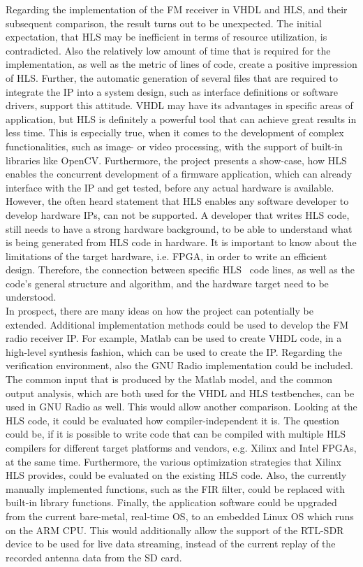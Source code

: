 Regarding the implementation of the FM receiver in VHDL and HLS, and their subsequent comparison, the result turns out to be unexpected.
The initial expectation, that HLS may be inefficient in terms of resource utilization, is contradicted.
Also the relatively low amount of time that is required for the implementation, as well as the metric of lines of code, create a positive impression of HLS.
Further, the automatic generation of several files that are required to integrate the IP into a system design, such as interface definitions or software drivers, support this attitude.
VHDL may have its advantages in specific areas of application, but HLS is definitely a powerful tool that can achieve great results in less time.
This is especially true, when it comes to the development of complex functionalities, such as image- or video processing, with the support of built-in libraries like OpenCV.
Furthermore, the project presents a show-case, how HLS enables the concurrent development of a firmware application, which can already interface with the IP and get tested, before any actual hardware is available.\\

However, the often heard statement that HLS enables any software developer to develop hardware IPs, can not be supported.
A developer that writes HLS code, still needs to have a strong hardware background, to be able to understand what is being generated from HLS code in hardware.
It is important to know about the limitations of the target hardware, i.e. FPGA, in order to write an efficient design.
Therefore, the connection between specific HLS \cplusplus\ code lines, as well as the code's general structure and algorithm, and the hardware target need to be understood.\\

In prospect, there are many ideas on how the project can potentially be extended.
Additional implementation methods could be used to develop the FM radio receiver IP.
For example, Matlab can be used to create VHDL code, in a high-level synthesis fashion, which can be used to create the IP.
Regarding the verification environment, also the GNU Radio implementation could be included.
The common input that is produced by the Matlab model, and the common output analysis, which are both used for the VHDL and HLS testbenches, can be used in GNU Radio as well.
This would allow another comparison.
Looking at the HLS code, it could be evaluated how compiler-independent it is.
The question could be, if it is possible to write code that can be compiled with multiple HLS compilers for different target platforms and vendors, e.g. Xilinx and Intel FPGAs, at the same time.
Furthermore, the various optimization strategies that Xilinx HLS provides, could be evaluated on the existing HLS code.
Also, the currently manually implemented functions, such as the FIR filter, could be replaced with built-in library functions.
Finally, the application software could be upgraded from the current bare-metal, real-time OS, to an embedded Linux OS which runs on the ARM CPU.
This would additionally allow the support of the RTL-SDR device to be used for live data streaming, instead of the current replay of the recorded antenna data from the SD card.\\

